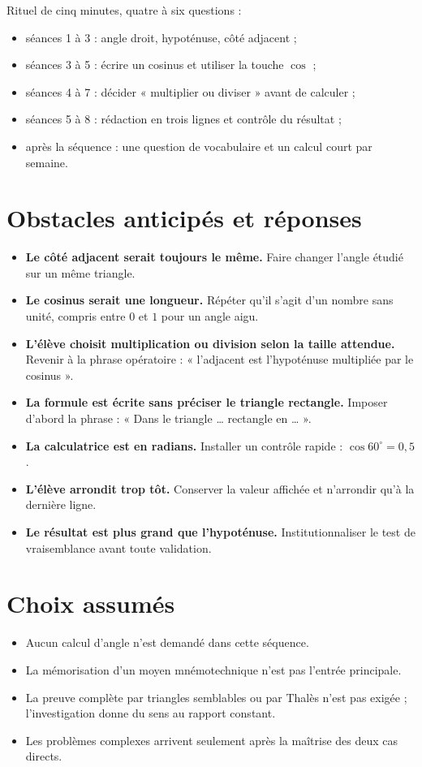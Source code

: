 \documentclass[12pt,a4paper]{article}
\begin{document}
Rituel de cinq minutes, quatre à six questions :

\begin{itemize}
  \item séances 1 à 3 : angle droit, hypoténuse, côté adjacent ;
  \item séances 3 à 5 : écrire un cosinus et utiliser la touche \(\cos\) ;
  \item séances 4 à 7 : décider « multiplier ou diviser » avant de calculer ;
  \item séances 5 à 8 : rédaction en trois lignes et contrôle du résultat ;
  \item après la séquence : une question de vocabulaire et un calcul court par semaine.
\end{itemize}

\section*{Obstacles anticipés et réponses}

\begin{itemize}
  \item \textbf{Le côté adjacent serait toujours le même.}
        Faire changer l'angle étudié sur un même triangle.
  \item \textbf{Le cosinus serait une longueur.}
        Répéter qu'il s'agit d'un nombre sans unité, compris entre \(0\) et \(1\)
        pour un angle aigu.
  \item \textbf{L'élève choisit multiplication ou division selon la taille attendue.}
        Revenir à la phrase opératoire :
        « l'adjacent est l'hypoténuse multipliée par le cosinus ».
  \item \textbf{La formule est écrite sans préciser le triangle rectangle.}
        Imposer d'abord la phrase :
        « Dans le triangle \ldots{} rectangle en \ldots{} ».
  \item \textbf{La calculatrice est en radians.}
        Installer un contrôle rapide :
        \(\cos 60^\circ=0{,}5\).
  \item \textbf{L'élève arrondit trop tôt.}
        Conserver la valeur affichée et n'arrondir qu'à la dernière ligne.
  \item \textbf{Le résultat est plus grand que l'hypoténuse.}
        Institutionnaliser le test de vraisemblance avant toute validation.
\end{itemize}

\section*{Choix assumés}

\begin{itemize}
  \item Aucun calcul d'angle n'est demandé dans cette séquence.
  \item La mémorisation d'un moyen mnémotechnique n'est pas l'entrée principale.
  \item La preuve complète par triangles semblables ou par Thalès n'est pas exigée ;
        l'investigation donne du sens au rapport constant.
  \item Les problèmes complexes arrivent seulement après la maîtrise des deux cas directs.
\end{itemize}
\end{document}
